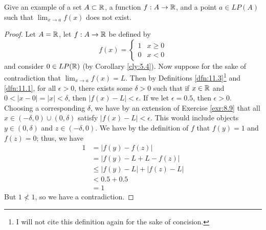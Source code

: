 \documentclass[../main.tex]{subfiles}
\begin{document}
\begin{exercise}\label{exr:11.4}
    Give an example of a set $A\subset\mathbb{R}$, a function $f:A\to\mathbb{R}$, and a point $a\in LP(A)$ such that $\lim_{x\to a}f(x)$ does not exist.
    \begin{proof}
        Let $A=\mathbb{R}$, let $f:A\to\mathbb{R}$ be defined by
        \begin{equation*}
            f(x) =
            \begin{cases}
                1 & x\geq 0\\
                0 & x<0
            \end{cases}
        \end{equation*}
        and consider $0\in LP(\mathbb{R})$ (by Corollary \ref{cly:5.4}). Now suppose for the sake of contradiction that $\lim_{x\to a}f(x)=L$. Then by Definitions \ref{dfn:11.3}\footnote{I will not cite this definition again for the sake of concision.} and \ref{dfn:11.1}, for all $\epsilon>0$, there exists some $\delta>0$ such that if $x\in\mathbb{R}$ and $0<|x-0|=|x|<\delta$, then $|f(x)-L|<\epsilon$. If we let $\epsilon=0.5$, then $\epsilon>0$. Choosing a corresponding $\delta$, we have by an extension of Exercise \ref{exr:8.9} that all $x\in(-\delta,0)\cup(0,\delta)$ satisfy $|f(x)-L|<\epsilon$. This would include objects $y\in(0,\delta)$ and $z\in(-\delta,0)$. We have by the definition of $f$ that $f(y)=1$ and $f(z)=0$; thus, we have
        \begin{align*}
            1 &= |f(y)-f(z)|\\
            &= |f(y)-L+L-f(z)|\\
            &\leq |f(y)-L|+|f(z)-L|\\
            &< 0.5+0.5\\
            &= 1
        \end{align*}
        But $1\not<1$, so we have a contradiction.
    \end{proof}
\end{exercise}
\end{document}
